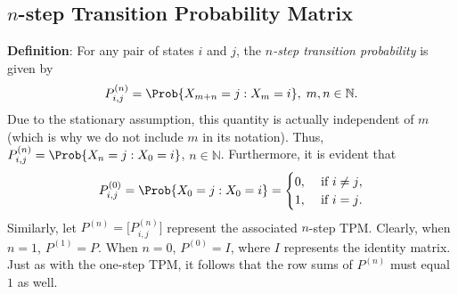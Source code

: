 \subsection*{$ n $-step Transition Probability Matrix}
\begin{Regular}
    \textbf{Definition}: For any pair of states $ i $ and $ j $, the \emph{$ n $-step transition probability} is given by
    \[ P_{i,j}^{(n)}=\Prob{X_{m+n}=j\given X_m=i},\; m,n\in\mathbb{N}. \]
    Due to the stationary assumption, this quantity is actually independent of $m$ (which is why we
    do not include $m$ in its notation). Thus, $ P_{i,j}^{(n)}=\Prob{X_n=j\given X_0=i} $, $ n\in\mathbb{N} $.
    Furthermore, it is evident that
    \[ P_{i,j}^{(0)}=\Prob{X_0=j\given X_0=i}=
        \begin{cases}
            0, & \text{ if $ i\ne j $}, \\
            1, & \text{ if $ i=j $.}
        \end{cases} \]
    Similarly, let $ P^{(n)}=\bigl[P_{i,j}^{(n)}\bigr] $ represent the associated $ n $-step TPM\@. Clearly, when $ n=1 $,
    $ P^{(1)}=P $. When $ n=0 $, $ P^{(0)}=I $, where $ I $ represents the identity matrix. Just as with the one-step TPM, it follows that
    the row sums of $ P^{(n)} $ must equal $ 1 $ as well.
\end{Regular}
